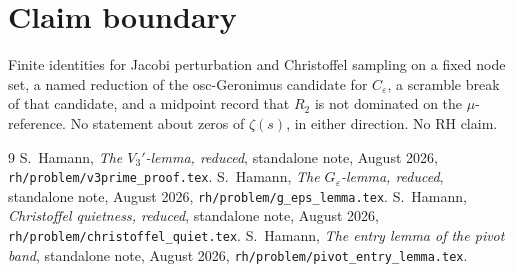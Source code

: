 \documentclass[11pt]{article}
\theoremstyle{remark}
\begin{document}
\section*{Claim boundary}

Finite identities for Jacobi perturbation and Christoffel sampling
on a fixed node set, a named reduction of the osc-Geronimus candidate
for $C_\varepsilon$, a scramble break of that candidate, and a
midpoint record that $R_2$ is not dominated on the $\mu$-reference.
No statement about zeros of $\zeta(s)$, in either direction.
No RH claim.

\begin{thebibliography}{9}
S.~Hamann,
\textit{The $V_3'$-lemma, reduced},
standalone note, August 2026,
\texttt{rh/problem/v3prime\_proof.tex}.
S.~Hamann,
\textit{The $G_\varepsilon$-lemma, reduced},
standalone note, August 2026,
\texttt{rh/problem/g\_eps\_lemma.tex}.
S.~Hamann,
\textit{Christoffel quietness, reduced},
standalone note, August 2026,
\texttt{rh/problem/christoffel\_quiet.tex}.
S.~Hamann,
\textit{The entry lemma of the pivot band},
standalone note, August 2026,
\texttt{rh/problem/pivot\_entry\_lemma.tex}.
\end{thebibliography}
\end{document}
